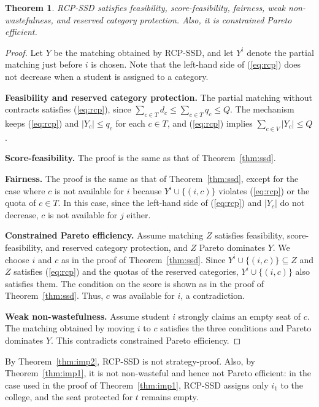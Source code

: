 \documentclass[a4paper,twoside]{article}
\newtheorem{theorem}{Theorem}
\theoremstyle{definition}
\begin{document}
\begin{theorem}
\label{thm:rcpssd}
RCP-SSD satisfies feasibility, score-feasibility, fairness, weak non-wastefulness, and
reserved category protection. Also, it is constrained Pareto efficient.
\end{theorem}
\begin{proof}
Let $Y$ be the matching obtained by RCP-SSD, and let $Y^i$ denote the partial matching
just before $i$ is chosen.
Note that the left-hand side of (\ref{eq:rcp}) does not decrease when a student is
assigned to a category.

\textbf{Feasibility and reserved category protection.}
The partial matching without contracts satisfies (\ref{eq:rcp}), since
$\sum_{c\in T}d_c\le\sum_{c\in T}q_c\le Q$.
The mechanism keeps (\ref{eq:rcp}) and $|Y_c|\le q_c$ for each $c\in T$, and
(\ref{eq:rcp}) implies $\sum_{c\in V}|Y_c|\le Q$.

\textbf{Score-feasibility.}
The proof is the same as that of Theorem~\ref{thm:ssd}.

\textbf{Fairness.}
The proof is the same as that of Theorem~\ref{thm:ssd}, except for the case where $c$ is not
available for $i$ because $Y^i\cup\{(i,c)\}$ violates (\ref{eq:rcp}) or the quota of
$c\in T$.
In this case, since the left-hand side of (\ref{eq:rcp}) and $|Y_c|$ do not decrease,
$c$ is not available for $j$ either.

\textbf{Constrained Pareto efficiency.}
Assume matching $Z$ satisfies feasibility, score-feasibility, and reserved category
protection, and $Z$ Pareto dominates $Y$.
We choose $i$ and $c$ as in the proof of Theorem~\ref{thm:ssd}.
Since $Y^i\cup\{(i,c)\}\subseteq Z$ and $Z$ satisfies (\ref{eq:rcp}) and the quotas of
the reserved categories, $Y^i\cup\{(i,c)\}$ also satisfies them.
The condition on the score is shown as in the proof of Theorem~\ref{thm:ssd}.
Thus, $c$ was available for $i$, a contradiction.

\textbf{Weak non-wastefulness.}
Assume student $i$ strongly claims an empty seat of $c$.
The matching obtained by moving $i$ to $c$ satisfies the three conditions and Pareto
dominates $Y$. This contradicts constrained Pareto efficiency.
\end{proof}

By Theorem~\ref{thm:imp2}, RCP-SSD is not strategy-proof.
Also, by Theorem~\ref{thm:imp1}, it is not non-wasteful and hence not Pareto efficient:
in the case used in the proof of Theorem~\ref{thm:imp1}, RCP-SSD assigns only $i_1$
to the college, and the seat protected for $t$ remains empty.
\end{document}

